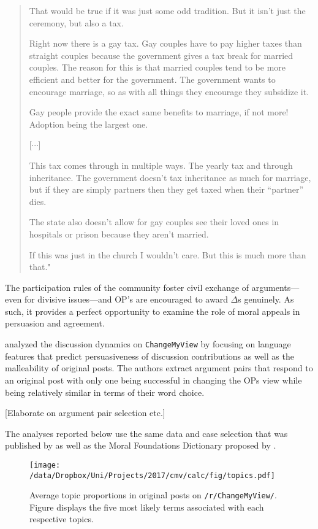 \begin{quote}\singlespacing
That would be true if it was just some odd tradition. But it isn't just the ceremony, but also a tax.

Right now there is a gay tax. Gay couples have to pay higher taxes than straight couples because the government gives a tax break for married couples. The reason for this is that married couples tend to be more efficient and better for the government. The government wants to encourage marriage, so as with all things they encourage they subsidize it.

Gay people provide the exact same benefits to marriage, if not more! Adoption being the largest one.

[\hspace{.2em}$\cdots$]

This tax comes through in multiple ways. The yearly tax and through inheritance. The government doesn't tax inheritance as much for marriage, but if they are simply partners then they get taxed when their ``partner'' dies.

The state also doesn't allow for gay couples see their loved ones in hospitals or prison because they aren't married.

If this was just in the church I wouldn't care. But this is much more than that."
\end{quote}
The participation rules of the community foster civil exchange of arguments---even for divisive issues---and OP's are encouraged to award \(\Delta\)s genuinely. As such, it provides a perfect opportunity to examine the role of moral appeals in persuasion and agreement.

\citet{tan2016winning} analyzed the discussion dynamics on \texttt{ChangeMyView} by focusing on language features that predict persuasiveness of discussion contributions as well as the malleability of original posts. The authors extract argument pairs that respond to an original post with only one being successful in changing the OPs view while being relatively similar in terms of their word choice.

{[}Elaborate on argument pair selection etc.{]}

The analyses reported below use the same data and case selection that was published by \citet{tan2016winning} as well as the Moral Foundations Dictionary proposed by \citet{graham2009liberals}.


\begin{figure}[ht]
\centering
\texttt{[image: /data/Dropbox/Uni/Projects/2017/cmv/calc/fig/topics.pdf]}
\caption{Average topic proportions in original posts on \texttt{/r/ChangeMyView/}. Figure displays the five most likely terms associated with each respective topics.}
\end{figure}



